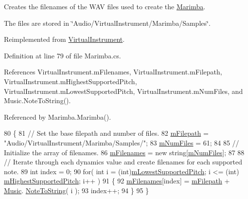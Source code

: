 Creates the filenames of the W\+AV files used to create the \hyperlink{class_marimba}{Marimba}. 

The files are stored in \char`\"{}\+Audio/\+Virtual\+Instrument/\+Marimba/\+Samples\char`\"{}. 

Reimplemented from \hyperlink{group___v_i_base_virt_func_gaacfc9521214176292bfb9665556fb991}{Virtual\+Instrument}.



Definition at line 79 of file Marimba.\+cs.



References Virtual\+Instrument.\+m\+Filenames, Virtual\+Instrument.\+m\+Filepath, Virtual\+Instrument.\+m\+Highest\+Supported\+Pitch, Virtual\+Instrument.\+m\+Lowest\+Supported\+Pitch, Virtual\+Instrument.\+m\+Num\+Files, and Music.\+Note\+To\+String().



Referenced by Marimba.\+Marimba().


\begin{DoxyCode}
80     \{
81         \textcolor{comment}{// Set the base filepath and number of files.}
82         \hyperlink{group___v_i_base_pro_var_gac428224be859933d720a9c533fdb5643}{mFilepath} = \textcolor{stringliteral}{"Audio/VirtualInstrument/Marimba/Samples/"};
83         \hyperlink{group___v_i_base_pro_var_ga9a602db8c9833ce75d95dd453c27d341}{mNumFiles} = 61;
84 
85         \textcolor{comment}{// Initialize the array of filenames.}
86         \hyperlink{group___v_i_base_pro_var_gab2add474ca506357688b5dd08cac4cb5}{mFilenames} = \textcolor{keyword}{new} \textcolor{keywordtype}{string}[\hyperlink{group___v_i_base_pro_var_ga9a602db8c9833ce75d95dd453c27d341}{mNumFiles}];
87 
88         \textcolor{comment}{// Iterate through each dynamics value and create filenames for each supported note.}
89         \textcolor{keywordtype}{int} index = 0;
90         \textcolor{keywordflow}{for}( \textcolor{keywordtype}{int} i = (\textcolor{keywordtype}{int})\hyperlink{group___v_i_base_pro_var_ga3cae52b1bcc0178a8a6b03c7aaf7aac8}{mLowestSupportedPitch}; i <= (int)
      \hyperlink{group___v_i_base_pro_var_ga61fb2c33b53a0f663047779d7ceb18f3}{mHighestSupportedPitch}; i++ )
91         \{
92             \hyperlink{group___v_i_base_pro_var_gab2add474ca506357688b5dd08cac4cb5}{mFilenames}[index] = \hyperlink{group___v_i_base_pro_var_gac428224be859933d720a9c533fdb5643}{mFilepath} + \hyperlink{class_music}{Music}.
      \hyperlink{group___music_stat_func_ga85a22c905d56d4c5f4e62159bfecee8c}{NoteToString}( i );
93             index++;
94         \}
95     \}
\end{DoxyCode}
\mbox{\label{group___mar_virt_ga293d829cb8571c21452c23e90968b2d8}} 
